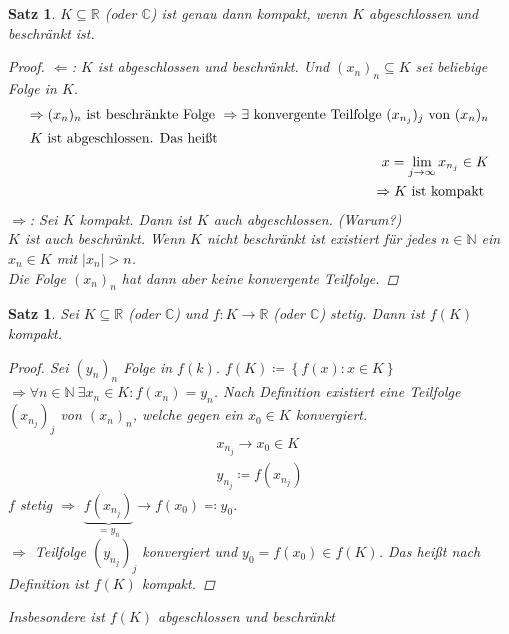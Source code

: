 \documentclass[11pt, twoside, a4paper]{article}
\theoremstyle{plain}
\newtheorem{satz}[blockelement]{Satz}
\newcommand{\set}[1]{\left\{#1\right\}}
\newcommand{\abs}[1]{\left|#1\right|}
\newcommand{\impl}[0]{\Rightarrow{}}
\newcommand{\definedas}[0]{\coloneqq}
\newcommand{\definedasbackwards}[0]{\eqqcolon}
\newcommand{\anf}[1]{\glqq{}#1\grqq}
\newcommand{\fromto}{\rightarrow{}}
\newcommand{\R}{\mathbb{R}}
\newcommand{\N}{\mathbb{N}}
\newcommand{\C}{\mathbb{C}}
\begin{document}
    \begin{satz} %
        $K\subseteq\R$ (oder $\C$) ist genau dann kompakt, wenn $K$ abgeschlossen und beschränkt ist.

        \begin{proof}
            \anf{$\Leftarrow$}: $K$ ist abgeschlossen und beschränkt. Und $(x_n)_n\subseteq K$ sei beliebige Folge in $K$.
            \begin{align*}
                \impl (x_n)_n \text{ ist beschränkte Folge }
                \impl \exists \text{ konvergente Teilfolge } (x_{n_j})_j \text{ von } (x_n)_n\\
                \intertext{$K$ ist abgeschlossen. Das heißt}
                x = \lim_{j\fromto\infty} x_{n_j} \in K\\
                \impl K \text{ ist kompakt }
            \end{align*}
            \anf{$\impl$}: Sei $K$ kompakt. Dann ist $K$ auch abgeschlossen. (Warum?)\\
            $K$ ist auch beschränkt. Wenn $K$ nicht beschränkt ist existiert für jedes $n\in\N$ ein $x_n\in K$ mit $\abs{x_n} > n$.\\
            Die Folge $(x_n)_n$ hat dann aber keine konvergente Teilfolge.
        \end{proof}
    \end{satz}

    \begin{satz} %
        Sei $K\subseteq\R$ (oder $\C$) und $f: K\fromto\R$ (oder $\C$) stetig. Dann ist $f(K)$ kompakt.
        \begin{proof}
            Sei $(y_n)_n$ Folge in $f(k)$. $f(K) \definedas\set{f(x): x\in K}$\\
            $\impl \forall n\in\N~\exists x_n\in K\colon f(x_n) = y_n$. Nach Definition existiert eine Teilfolge $(x_{n_j})_j$ von $(x_n)_n$, welche gegen ein $x_0\in K$ konvergiert.
            \begin{align*}
                x_{n_j} \fromto x_0 \in K\\
                y_{n_j} \definedas f(x_{n_j})
            \end{align*}
            $f$ stetig $\impl$ $\underbrace{f(x_{n_j})}_{=y_n} \fromto f(x_0) \definedasbackwards y_0$.\\
            $\impl$ Teilfolge $(y_{n_j})_j$ konvergiert und $y_0=f(x_0) \in f(K)$. Das heißt nach Definition ist $f(K)$ kompakt.
        \end{proof}
        Insbesondere ist $f(K)$ abgeschlossen und beschränkt
    \end{satz}
\end{document}
